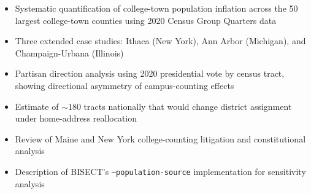 \begin{itemize}
    \item Systematic quantification of college-town population inflation across the 50 largest college-town counties using 2020 Census Group Quarters data
    \item Three extended case studies: Ithaca (New York), Ann Arbor (Michigan), and Champaign-Urbana (Illinois)
    \item Partisan direction analysis using 2020 presidential vote by census tract, showing directional asymmetry of campus-counting effects
    \item Estimate of $\sim$180 tracts nationally that would change district assignment under home-address reallocation
    \item Review of Maine and New York college-counting litigation and constitutional analysis
    \item Description of BISECT's \texttt{--population-source} implementation for sensitivity analysis
\end{itemize}
